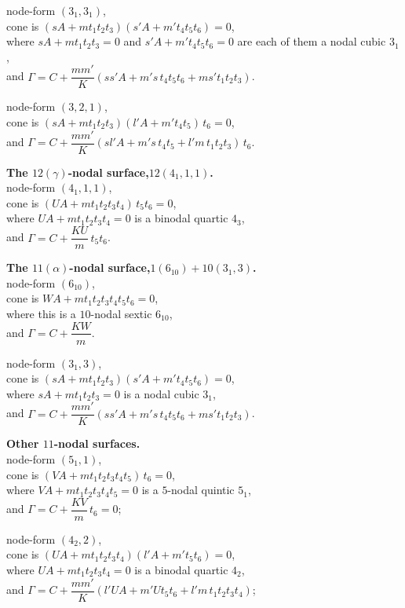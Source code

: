 \documentclass[11pt,a4paper]{article}
\begin{document}
\medskip
\noindent node-form $(3_1, 3_1)$,\\
cone is $(sA + m t_1 t_2 t_3)(s'A + m' t_4 t_5 t_6) = 0$,\\
where $sA + m t_1 t_2 t_3 = 0$ and $s'A + m' t_4 t_5 t_6 = 0$ are each of
them a nodal cubic $3_1$,\\
and $\Gamma = C + \dfrac{m m'}{K}(s s' A + m' s\, t_4 t_5 t_6
+ m s' t_1 t_2 t_3)$.

\medskip
\noindent node-form $(3, 2, 1)$,\\
cone is $(sA + m t_1 t_2 t_3)(l'A + m' t_4 t_5)\, t_6 = 0$,\\
and $\Gamma = C + \dfrac{m m'}{K}(s l' A + m' s\, t_4 t_5
+ l' m\, t_1 t_2 t_3)\, t_6$.

\medskip
\noindent\textbf{The $12(\gamma)$-nodal surface,\quad $12(4_1, 1, 1)$.}\\
node-form $(4_1, 1, 1)$,\\
cone is $(UA + m t_1 t_2 t_3 t_4)\, t_5 t_6 = 0$,\\
where $UA + m t_1 t_2 t_3 t_4 = 0$ is a binodal quartic $4_3$,\\
and $\Gamma = C + \dfrac{K U}{m}\, t_5 t_6$.

\medskip
\noindent\textbf{The $11(\alpha)$-nodal surface,\quad $1(6_{10}) + 10(3_1, 3)$.}\\
node-form $(6_{10})$,\\
cone is $WA + m t_1 t_2 t_3 t_4 t_5 t_6 = 0$,\\
where this is a $10$-nodal sextic $6_{10}$,\\
and $\Gamma = C + \dfrac{K W}{m}$.

\medskip
\noindent node-form $(3_1, 3)$,\\
cone is $(sA + m t_1 t_2 t_3)(s'A + m' t_4 t_5 t_6) = 0$,\\
where $sA + m t_1 t_2 t_3 = 0$ is a nodal cubic $3_1$,\\
and $\Gamma = C + \dfrac{m m'}{K}(s s' A + m' s\, t_4 t_5 t_6
+ m s' t_1 t_2 t_3)$.

\medskip
\noindent\textbf{Other $11$-nodal surfaces.}\\
node-form $(5_1, 1)$,\\
cone is $(VA + m t_1 t_2 t_3 t_4 t_5)\, t_6 = 0$,\\
where $VA + m t_1 t_2 t_3 t_4 t_5 = 0$ is a $5$-nodal quintic $5_1$,\\
and $\Gamma = C + \dfrac{K V}{m}\, t_6 = 0$;

\medskip
\noindent node-form $(4_2, 2)$,\\
cone is $(UA + m t_1 t_2 t_3 t_4)(l'A + m' t_5 t_6) = 0$,\\
where $UA + m t_1 t_2 t_3 t_4 = 0$ is a binodal quartic $4_2$,\\
and $\Gamma = C + \dfrac{m m'}{K}(l' U A + m' U t_5 t_6
+ l' m\, t_1 t_2 t_3 t_4)$;
\end{document}
